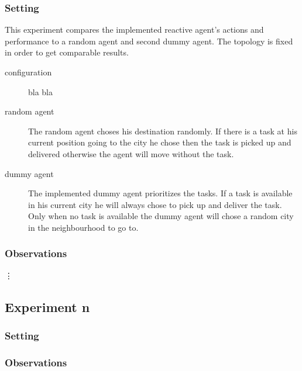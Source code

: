\documentclass[11pt]{article}
\begin{document}
\subsubsection{Setting}
This experiment compares the implemented reactive agent's actions and performance to a random agent and second dummy agent. The topology is fixed in  order to get comparable results. 
\begin{description}
\item[configuration]bla bla
\item[random agent]
The random agent choses his destination randomly. If there is a task at his current position going to the city he chose then the task is picked up and delivered otherwise the agent will move without the task.
\item [dummy agent]
The implemented dummy agent prioritizes the tasks. If a task is available in his current city he will always chose to pick up and deliver the task. Only when no task is available the dummy agent will chose a random city in the neighbourhood to go to. 


\end{description}



\subsubsection{Observations}

\vdots

\subsection{Experiment n}

\subsubsection{Setting}

\subsubsection{Observations}
\end{document}
